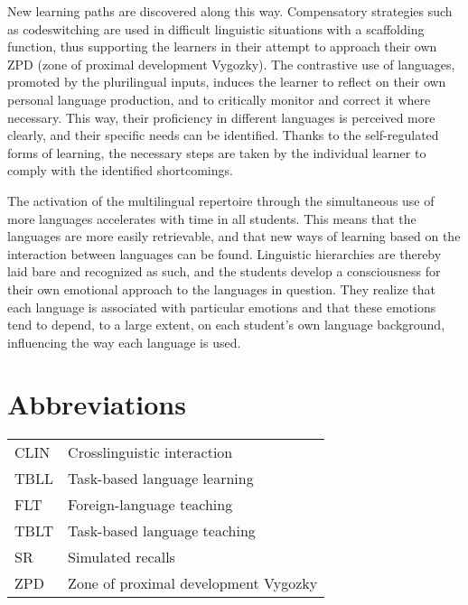 \documentclass[output=paper]{../langscibook}
\begin{document}
New learning paths are discovered along this way. Compensatory strategies such as codeswitching are used in difficult linguistic situations with a scaffolding function, thus supporting the learners in their attempt to approach their own ZPD (zone of proximal development Vygozky). The contrastive use of languages, promoted by the plurilingual inputs, induces the learner to reflect on their own personal language production, and to critically monitor and correct it where necessary. This way, their proficiency in different languages is perceived more clearly, and their specific needs can be identified. Thanks to the self-regulated forms of learning, the necessary steps are taken by the individual learner to comply with the identified shortcomings. 

The activation of the multilingual repertoire through the simultaneous use of more languages accelerates with time in all students. This means that the languages are more easily retrievable, and that new ways of learning based on the interaction between languages can be found. Linguistic hierarchies are thereby laid bare and recognized as such, and the students develop a consciousness for their own emotional approach to the languages in question. They realize that each language is associated with particular emotions and that these emotions tend to depend, to a large extent, on each student’s own language background, influencing the way each language is used.


\section*{Abbreviations}
\label{sec:8:abbreviations}

\begin{tabular}{@{}ll}
CLIN & Crosslinguistic interaction\\
TBLL & Task-based language learning\\
FLT & Foreign-language teaching\\
TBLT & Task-based language teaching\\
SR & Simulated recalls\\
ZPD & Zone of proximal development Vygozky\\
\end{tabular}

{\sloppy\printbibliography[heading=subbibliography,notkeyword=this]}
\end{document}
